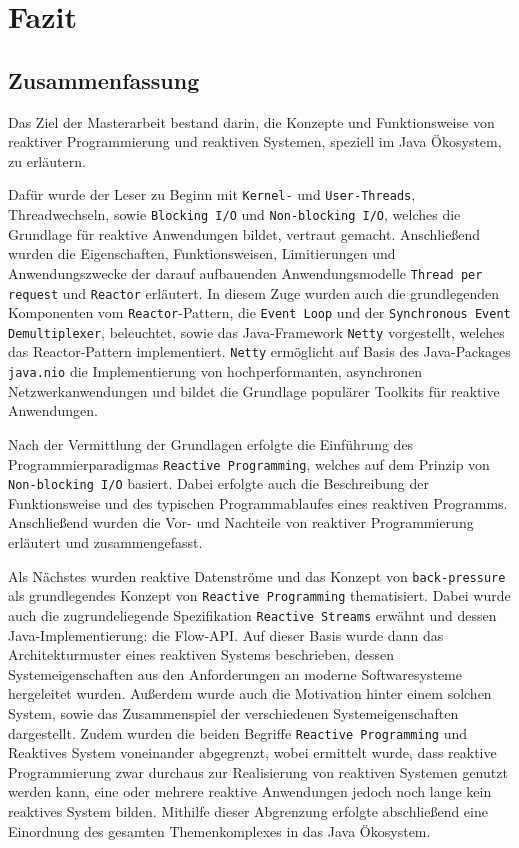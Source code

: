 \section{Fazit}
\label{sec:fazit}
\subsection{Zusammenfassung}
\label{subsec:zusammenfassung}
Das Ziel der Masterarbeit bestand darin, die Konzepte und Funktionsweise von reaktiver Programmierung und reaktiven Systemen, speziell im Java Ökosystem,
zu erläutern.

Dafür wurde der Leser zu Beginn mit \verb|Kernel-| und \verb|User-Threads|,
Threadwechseln, sowie \verb|Blocking I/O| und \verb|Non-blocking I/O|, welches die Grundlage
für reaktive Anwendungen bildet, vertraut gemacht.
Anschließend wurden die Eigenschaften, Funktionsweisen, Limitierungen und Anwendungszwecke der darauf aufbauenden Anwendungsmodelle
\verb|Thread per request| und \verb|Reactor| erläutert. In diesem Zuge wurden auch die grundlegenden Komponenten vom \verb|Reactor|-Pattern,
die \verb|Event Loop| und der \verb|Synchronous Event Demultiplexer|, beleuchtet, sowie das Java-Framework \verb|Netty| vorgestellt, welches
das Reactor-Pattern implementiert.
\verb|Netty| ermöglicht auf Basis des Java-Packages \verb|java.nio| die Implementierung von
hochperformanten, asynchronen Netzwerkanwendungen und bildet die Grundlage populärer Toolkits für reaktive Anwendungen.\newline

Nach der Vermittlung der Grundlagen erfolgte die Einführung des Programmierparadigmas \verb|Reactive Programming|, welches
auf dem Prinzip von \verb|Non-blocking I/O| basiert. Dabei erfolgte auch die Beschreibung der Funktionsweise und des typischen Programmablaufes
eines reaktiven Programms.
Anschließend wurden die Vor- und Nachteile von reaktiver Programmierung erläutert und zusammengefasst.

Als Nächstes wurden reaktive Datenströme und das Konzept von \verb|back-pressure| als grundlegendes Konzept von \verb|Reactive Programming|
thematisiert. Dabei wurde auch die zugrundeliegende Spezifikation \verb|Reactive Streams| erwähnt und dessen Java-Implementierung: die Flow-API.
Auf dieser Basis wurde dann das Architekturmuster eines reaktiven Systems beschrieben, dessen Systemeigenschaften aus den
Anforderungen an moderne Softwaresysteme hergeleitet wurden. Außerdem wurde auch die Motivation hinter einem solchen System, sowie
das Zusammenspiel der verschiedenen Systemeigenschaften dargestellt. Zudem wurden die beiden Begriffe \verb|Reactive Programming| und Reaktives System
voneinander abgegrenzt, wobei ermittelt wurde, dass reaktive Programmierung zwar durchaus zur Realisierung von reaktiven Systemen genutzt werden kann,
eine oder mehrere reaktive Anwendungen jedoch noch lange kein reaktives System bilden.
Mithilfe dieser Abgrenzung erfolgte abschließend eine Einordnung des gesamten Themenkomplexes in das Java Ökosystem.

